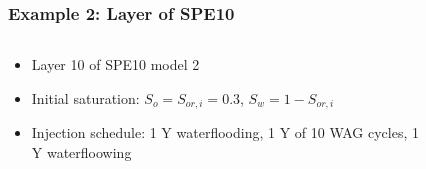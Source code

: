 \documentclass[screen, aspectratio=43]{beamer}
\begin{document}
\begin{frame}
  \frametitle{Example 2: Layer of SPE10}
  \begin{columns}
    \begin{column}{0.55\textwidth}
      \begin{itemize}
      \item Layer 10 of SPE10 model 2
      \item Initial saturation: $S_o = S_{or,i} = 0.3$, $S_w = 1 - S_{or, i}$
      \item Injection schedule: 1 Y waterflooding, 1 Y of 10 WAG cycles, 1 Y waterfloowing
      \end{itemize}
    \end{column}
    \begin{column}{0.45\textwidth}
      \begin{figure}[h]
        \centering
         \\
      \end{figure}
    \end{column}
  \end{columns}
\end{frame}
\end{document}

